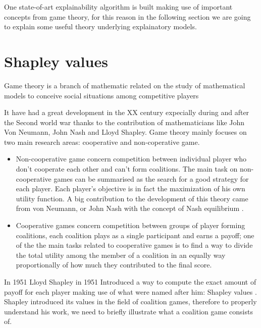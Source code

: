 \documentclass[10pt]{report}
\begin{document}
One state-of-art explainability algorithm is built making use of important concepts from game theory, for this reason in the following section we are going to explain some useful theory underlying explainatory models.


\section{Shapley values}
Game theory is a branch of mathematic related on the study of mathematical models to  conceive social situations among competitive players \cite{ross-2021}

It have had a great development in the XX century expecially during and after the Second world war thanks to the contribution of mathematicians like John Von Neumann, John Nash and Lloyd Shapley.
Game theory mainly focuses on two main research areas: cooperative and non-coperative game.
\begin{itemize}
\item Non-cooperative game concern competition between individual player who don't cooperate each other and can't form coalitions. The main task on non-cooperative games can be summarised as the search for a good strategy for each player. Each player's objective is in fact the maximization of his own utility function.
A big contribution to the development of this theory came from von Neumann, or John Nash with the concept of Nash equilibrium \cite{nash-1950}.

\item Cooperative games concern competition between groups of player forming coalitions, each coalition plays as a single participant and earns a payoff; one of the the main tasks related to cooperative games is to find a way to divide the total utility among the member of a coalition in an equally way proportionally of how much they contributed to the final score.
\end{itemize}
In 1951 Lloyd Shapley in 1951 Introduced a way to compute the exact amount of payoff for each player making use of what were named after him: Shapley values \cite{shap-1951}\cite{shap-1953}.
Shapley introduced its values in the field of coalition games, therefore to properly understand his work, we need to briefly illustrate what a coalition game consists of.
\end{document}
